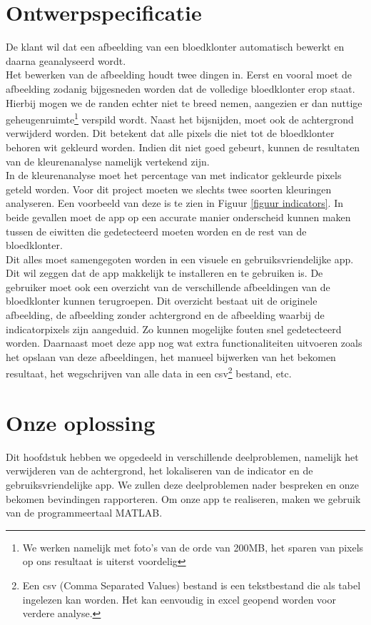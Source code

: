 \documentclass[a4paper,kulak]{kulakarticle}
\begin{document}
\section{Ontwerpspecificatie}
De klant wil dat een afbeelding van een bloedklonter automatisch bewerkt en daarna geanalyseerd wordt.\\
Het bewerken van de afbeelding houdt twee dingen in. Eerst en vooral moet de afbeelding zodanig bijgesneden worden dat de volledige bloedklonter erop staat. Hierbij mogen we de randen echter niet te breed nemen, aangezien er dan nuttige geheugenruimte\footnote{We werken namelijk met foto's van de orde van 200MB, het sparen van pixels op ons resultaat is uiterst voordelig} verspild wordt. 
Naast het bijsnijden, moet ook de achtergrond verwijderd worden. Dit betekent dat alle pixels die niet tot de bloedklonter behoren wit gekleurd worden. Indien dit niet goed gebeurt, kunnen de resultaten van de kleurenanalyse namelijk vertekend zijn.\\
In de kleurenanalyse moet het percentage van met indicator gekleurde pixels geteld worden. Voor dit project moeten we slechts twee soorten kleuringen analyseren. Een voorbeeld van deze is te zien in Figuur \ref{figuur indicators}. In beide gevallen moet de app op een accurate manier onderscheid kunnen maken tussen de eiwitten die gedetecteerd moeten worden en de rest van de bloedklonter. \\
Dit alles moet samengegoten worden in een visuele en gebruiksvriendelijke app. Dit wil zeggen dat de app makkelijk te installeren en te gebruiken is. De gebruiker moet ook een overzicht van de verschillende afbeeldingen van de bloedklonter kunnen terugroepen. Dit overzicht bestaat uit de originele afbeelding, de afbeelding zonder achtergrond en de afbeelding waarbij de indicatorpixels zijn aangeduid. Zo kunnen mogelijke fouten snel gedetecteerd worden. Daarnaast moet deze app nog wat extra functionaliteiten uitvoeren zoals het opslaan van deze afbeeldingen, het manueel bijwerken van het bekomen resultaat, het wegschrijven van alle data in een csv\footnote{Een csv (Comma Separated Values) bestand is een tekstbestand die als tabel ingelezen kan worden. Het kan eenvoudig in excel geopend worden voor verdere analyse.} bestand, etc.

\section{Onze oplossing}
Dit hoofdstuk hebben we opgedeeld in verschillende deelproblemen, namelijk het verwijderen van de achtergrond, het lokaliseren van de indicator en de gebruiksvriendelijke app. We zullen deze deelproblemen nader bespreken en onze bekomen bevindingen rapporteren. Om onze app te realiseren, maken we gebruik van de programmeertaal MATLAB.
\end{document}

